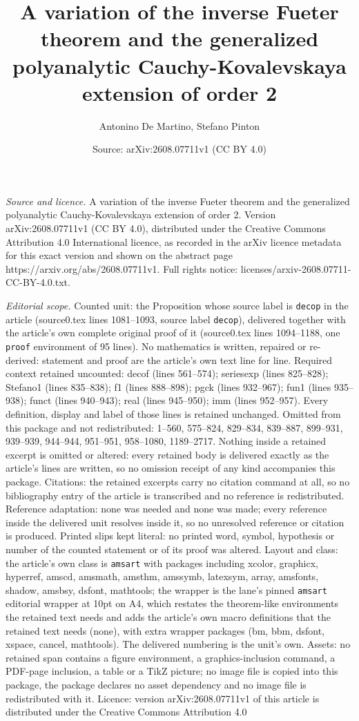 \documentclass[10pt,a4paper]{amsart}
\title[A variation of the inverse Fueter theorem and the generalize]{A variation of the inverse Fueter theorem and the generalized polyanalytic Cauchy-Kovalevskaya extension of order 2}
\author{Antonino De Martino, Stefano Pinton}
\date{Source: arXiv:2608.07711v1 (CC BY 4.0)}
\begin{document}
\maketitle

\noindent\emph{Source and licence.} A variation of the inverse Fueter theorem and the generalized polyanalytic Cauchy-Kovalevskaya extension of order 2. Version arXiv:2608.07711v1 (CC BY 4.0), distributed under the Creative Commons Attribution 4.0 International licence, as recorded in the arXiv licence metadata for this exact version and shown on the abstract page https://arxiv.org/abs/2608.07711v1. Full rights notice: licenses/arxiv-2608.07711-CC-BY-4.0.txt.\par\smallskip

\noindent\textit{Editorial scope.} Counted unit: the Proposition whose source label is \texttt{decop} in the article (source0.tex lines 1081--1093, source label \texttt{decop}), delivered together with the article's own complete original proof of it (source0.tex lines 1094--1188, one \texttt{proof} environment of 95 lines). No mathematics is written, repaired or re-derived: statement and proof are the article's own text line for line. Required context retained uncounted: decof (lines 561--574); seriesexp (lines 825--828); Stefano1 (lines 835--838); f1 (lines 888--898); pgck (lines 932--967); fun1 (lines 935--938); funct (lines 940--943); real (lines 945--950); imm (lines 952--957). Every definition, display and label of those lines is retained unchanged. Omitted from this package and not redistributed: 1--560, 575--824, 829--834, 839--887, 899--931, 939--939, 944--944, 951--951, 958--1080, 1189--2717. Nothing inside a retained excerpt is omitted or altered: every retained body is delivered exactly as the article's lines are written, so no omission receipt of any kind accompanies this package. Citations: the retained excerpts carry no citation command at all, so no bibliography entry of the article is transcribed and no reference is redistributed. Reference adaptation: none was needed and none was made; every reference inside the delivered unit resolves inside it, so no unresolved reference or citation is produced. Printed slips kept literal: no printed word, symbol, hypothesis or number of the counted statement or of its proof was altered. Layout and class: the article's own class is \texttt{amsart} with packages including xcolor, graphicx, hyperref, amscd, amsmath, amsthm, amssymb, latexsym, array, amsfonts, shadow, amsbsy, dsfont, mathtools; the wrapper is the lane's pinned \texttt{amsart} editorial wrapper at 10pt on A4, which restates the theorem-like environments the retained text needs and adds the article's own macro definitions that the retained text needs (none), with extra wrapper packages (bm, bbm, dsfont, xspace, cancel, mathtools). The delivered numbering is the unit's own. Assets: no retained span contains a figure environment, a graphics-inclusion command, a PDF-page inclusion, a table or a TikZ picture; no image file is copied into this package, the package declares no asset dependency and no image file is redistributed with it. Licence: version arXiv:2608.07711v1 of this article is distributed under the Creative Commons Attribution 4.0 
\end{document}
